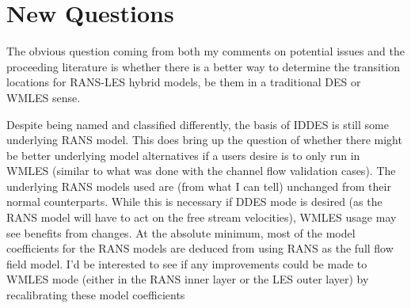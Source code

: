 \documentclass{ucb}
\begin{document}
\section{New Questions}
The obvious question coming from both my comments on potential issues and the proceeding literature is whether there is a better way to determine the transition locations for RANS-LES hybrid models, be them in a traditional DES or WMLES sense.

Despite being named and classified differently, the basis of IDDES is still some underlying RANS model. This does bring up the question of whether there might be better underlying model alternatives if a users desire is to only run in WMLES (similar to what was done with the channel flow validation cases). 
The underlying RANS models used are (from what I can tell) unchanged from their normal counterparts. While this is necessary if DDES mode is desired (as the RANS model will have to act on the free stream velocities), WMLES usage may see benefits from changes. At the absolute minimum, most of the model coefficients for the RANS models are deduced from using RANS as the full flow field model. I'd be interested to see if any improvements could be made to WMLES mode (either in the RANS inner layer or the LES outer layer) by recalibrating these model coefficients
\ucbbib{}
    
\end{document}
